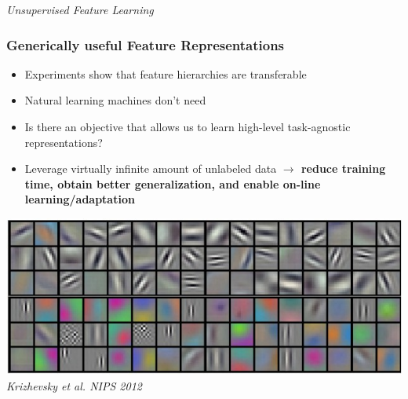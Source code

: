 \documentclass{beamer}
\begin{document}
\begin{frame}
\begin{center} 
\huge \color{blue} \emph{Unsupervised Feature Learning}
\end{center} 
\end{frame} 

\begin{frame}
\frametitle{Generically useful Feature Representations} 
\begin{itemize} 
\item{Experiments show that feature hierarchies are transferable}
\item{Natural learning machines don't need }
\item{Is there an objective that allows us to learn high-level task-agnostic representations?}
\item{Leverage virtually infinite amount of unlabeled data \bf $\rightarrow$ reduce training time, obtain better generalization, and enable on-line learning/adaptation}
\end{itemize} 
\centering
\includegraphics[scale=0.25]{./Figures/weights.jpeg} \\
\emph{\tiny{Krizhevsky et al. NIPS 2012}} 
\end{frame} 
\end{document}
